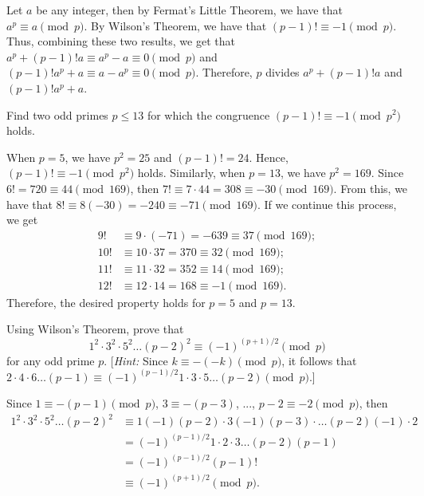 \begin{solution}
    Let $a$ be any integer, then by Fermat's Little Theorem, we have that $a^p \equiv a \pmod p$. By Wilson's Theorem, we have that $(p-1)! \equiv -1 \pmod p$. Thus, combining these two results, we get that $a^p + (p-1)! a \equiv a^p - a \equiv 0 \pmod p$ and $(p-1)!a^p + a \equiv a-a^p \equiv 0 \pmod p$. Therefore, $p$ divides $a^p + (p-1)!a$ and $(p-1)!a^p + a$. \\
\end{solution}

\begin{exercise}
    Find two odd primes $p \leq 13$ for which the congruence $(p-1)! \equiv -1 \pmod{p^2}$ holds. \\
\end{exercise}

\begin{solution}
    When $p = 5$, we have $p^2 = 25$ and $(p-1)! = 24$. Hence, $(p-1)! \equiv -1 \pmod{p^2}$ holds. Similarly, when $p = 13$, we have $p^2 = 169$. Since $6! = 720 \equiv 44 \pmod{169}$, then $7! \equiv 7\cdot 44 = 308 \equiv -30 \pmod{169}$. From this, we have that $8! \equiv 8(-30) = -240 \equiv -71 \pmod{169}$. If we continue this process, we get
    \begin{align*}
        9! &\equiv 9\cdot (-71) = -639 \equiv 37 \pmod{169}; \\
        10! &\equiv 10 \cdot 37 = 370 \equiv 32 \pmod{169}; \\
        11! &\equiv 11\cdot 32 = 352 \equiv 14 \pmod{169}; \\
        12! &\equiv 12 \cdot 14 = 168 \equiv - 1 \pmod{169}.
    \end{align*}
    Therefore, the desired property holds for $p = 5$ and $p = 13$. \\
\end{solution}

\begin{exercise}
    Using Wilson's Theorem, prove that
    $$1^2\cdot 3^2 \cdot 5^2 \dots (p-2)^2 \equiv (-1)^{(p+1)/2} \pmod{p}$$
    for any odd prime $p$. [\textit{Hint:} Since $k \equiv -(-k)\pmod{p}$, it follows that $2\cdot 4 \cdot 6 \dots (p-1) \equiv (-1)^{(p-1)/2}1\cdot 3 \cdot 5 \dots (p-2) \pmod{p}$.] \\
\end{exercise}

\begin{solution}
    Since $1 \equiv -(p-1) \pmod{p}$, $3 \equiv -(p-3)$, ..., $p-2 \equiv -2 \pmod{p}$, then
    \begin{align*}
        1^2\cdot 3^2 \cdot 5^2 \dots (p-2)^2 &\equiv 1(-1)(p-2)\cdot 3(-1)(p-3) \cdot \dots (p-2)(-1)\cdot 2 \\
        &= (-1)^{(p-1)/2}1\cdot 2\cdot 3 \dots (p-2)(p-1) \\
        &= (-1)^{(p-1)/2} (p-1)! \\
        &\equiv (-1)^{(p+1)/2} \pmod{p}.\\
    \end{align*}
\end{solution}

